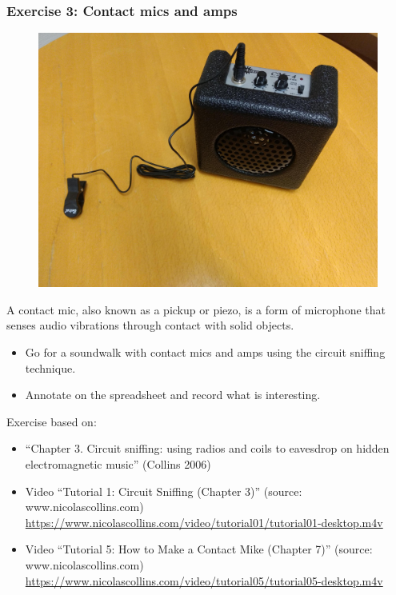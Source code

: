 \documentclass[screen, aspectratio=43]{beamer}
\begin{document}
\begin{frame}
  \frametitle{Exercise 3: Contact mics and amps}
 \begin{figure}
	\includegraphics[scale=0.05]{img/contactmics.jpg}
\end{figure}  

  {\scriptsize 
  A contact mic, also known as a pickup or piezo, is a form of microphone that senses audio vibrations through contact with solid objects.
  \begin{itemize}
    \item Go for a soundwalk with contact mics and amps using the circuit sniffing technique.    
    \item Annotate on the spreadsheet and record what is interesting.
  \end{itemize}
  }
  {\tiny Exercise based on:	  
    \begin{itemize}
	\item ``Chapter 3. Circuit sniffing: using radios and coils to eavesdrop on hidden electromagnetic music'' (Collins 2006)
	\item Video ``Tutorial 1: Circuit Sniffing (Chapter 3)'' (source: www.nicolascollins.com)\\ 
	\url{https://www.nicolascollins.com/video/tutorial01/tutorial01-desktop.m4v}
	\item Video ``Tutorial 5: How to Make a Contact Mike (Chapter 7)'' (source: www.nicolascollins.com)\\
	\url{https://www.nicolascollins.com/video/tutorial05/tutorial05-desktop.m4v}
    \end{itemize}
   } 
\end{frame}
\end{document}
